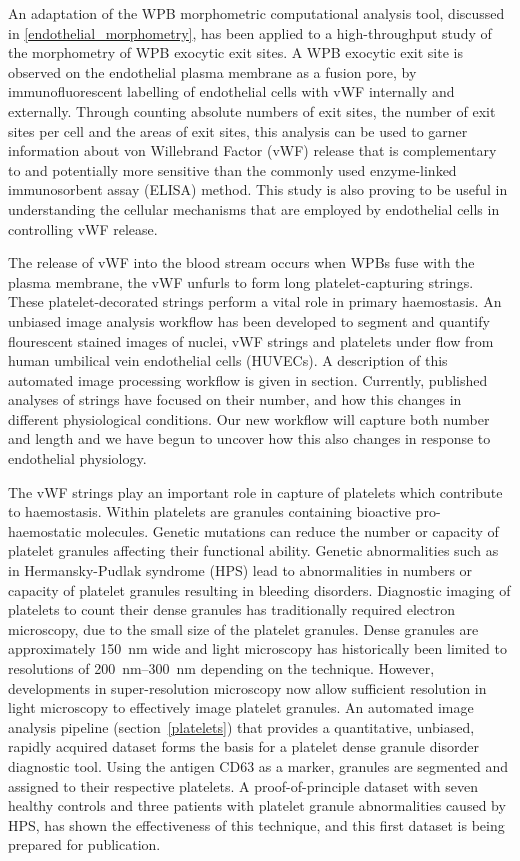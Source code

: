 An adaptation of the WPB morphometric computational analysis tool, discussed in \autoref{endothelial_morphometry}, has been applied to a high-throughput study of the morphometry of WPB exocytic exit sites. A WPB exocytic exit site is observed on the endothelial plasma membrane as a fusion pore, by immunofluorescent labelling of endothelial cells with vWF internally and externally. Through counting absolute numbers of exit sites, the number of exit sites per cell and the areas of exit sites, this analysis can be used to garner information about von Willebrand Factor (vWF) release that is complementary to and potentially more sensitive than the commonly used enzyme-linked immunosorbent assay (ELISA) method. This study is also proving to be useful in understanding the cellular mechanisms that are employed by endothelial cells in controlling vWF release.

The release of vWF into the blood stream occurs when WPBs fuse with the plasma membrane, the vWF unfurls to form long platelet-capturing strings. These platelet-decorated strings perform a vital role in primary haemostasis. An unbiased image analysis workflow has been developed to segment and quantify flourescent stained images of nuclei, vWF strings and platelets under flow from human umbilical vein endothelial cells (HUVECs). A description of this automated image processing workflow is given in section. Currently, published analyses of strings have focused on their number, and how this changes in different physiological conditions. Our new workflow will capture both number and length and we have begun to uncover how this also changes in response to endothelial physiology. 

The vWF strings play an important role in capture of platelets which contribute to haemostasis. Within platelets are granules containing bioactive pro-haemostatic molecules.  Genetic mutations can reduce the number or capacity of platelet granules affecting their functional ability. Genetic abnormalities such as in Hermansky-Pudlak syndrome (HPS) lead to abnormalities in numbers or capacity of platelet granules resulting in bleeding disorders. Diagnostic imaging of platelets to count their dense granules has traditionally required electron microscopy, due to the small size of the platelet granules. Dense granules are approximately \SI{150}{\nano\metre} wide and light microscopy has historically been limited to resolutions of  \SIrange{200}{300}{\nano\metre} depending on the technique. However, developments in super-resolution microscopy now allow sufficient resolution in light microscopy to effectively image platelet granules. An automated image analysis pipeline (section~\autoref{platelets}) that provides a quantitative, unbiased, rapidly acquired dataset forms the basis for a platelet dense granule disorder diagnostic tool. Using the antigen CD63 as a marker, granules are segmented and assigned to their respective platelets. A proof-of-principle dataset with seven healthy controls and three patients with platelet granule abnormalities caused by HPS, has shown the effectiveness of this technique, and this first dataset is being prepared for publication.

